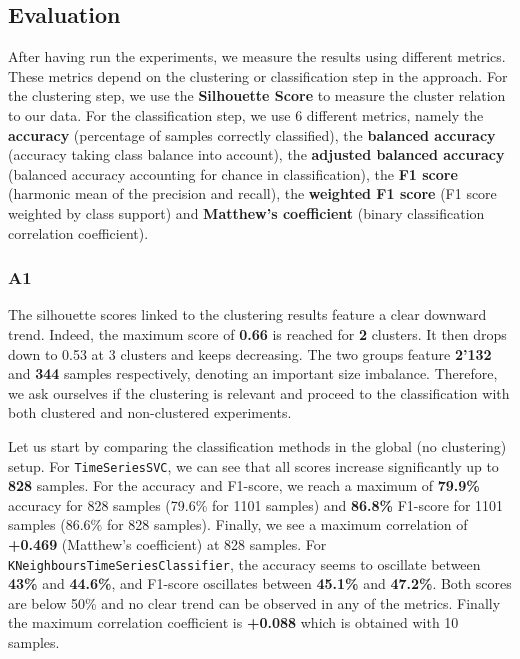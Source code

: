 \documentclass[sigplan,screen]{acmart}
\begin{document}
\subsection{Evaluation}\label{subsec:eval_results}

After having run the experiments, we measure the results using different metrics. These metrics depend on the clustering or classification step in the approach. For the clustering step, we use the \textbf{Silhouette Score} to measure the cluster relation to our data. For the classification step, we use 6 different metrics\cite{scikit-learn}, namely the \textbf{accuracy} (percentage of samples correctly classified), the \textbf{balanced accuracy} (accuracy taking class balance into account), the \textbf{adjusted balanced accuracy} (balanced accuracy accounting for chance in classification), the \textbf{F1 score} (harmonic mean of the precision and recall), the \textbf{weighted F1 score} (F1 score weighted by class support) and \textbf{Matthew's coefficient} (binary classification correlation coefficient).

\subsubsection{A1}

The silhouette scores linked to the clustering results feature a clear downward trend. Indeed, the maximum score of \textbf{0.66} is reached for \textbf{2} clusters. It then drops down to 0.53 at 3 clusters and keeps decreasing. The two groups feature \textbf{2'132} and \textbf{344} samples respectively, denoting an important size imbalance. Therefore, we ask ourselves if the clustering is relevant and proceed to the classification with both clustered and non-clustered experiments.

Let us start by comparing the classification methods in the global (no clustering) setup. For \texttt{TimeSeriesSVC}, we can see that all scores increase significantly up to \textbf{828} samples. For the accuracy and F1-score, we reach a maximum of \textbf{79.9\%} accuracy for 828 samples (79.6\% for 1101 samples) and \textbf{86.8\%} F1-score for 1101 samples (86.6\% for 828 samples). Finally, we see a maximum correlation of \textbf{+0.469} (Matthew’s coefficient) at 828 samples.
For \texttt{KNeighboursTimeSeriesClassifier}, the accuracy seems to oscillate between \textbf{43\%} and \textbf{44.6\%}, and F1-score oscillates between \textbf{45.1\%} and \textbf{47.2\%}. Both scores are below 50\% and no clear trend can be observed in any of the metrics. Finally the maximum correlation coefficient is \textbf{+0.088} which is obtained with 10 samples.
\end{document}
